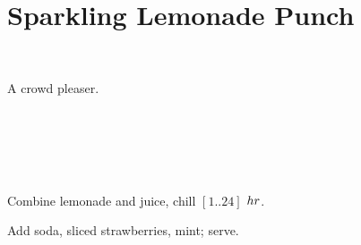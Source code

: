\section[Lemonade Punch]{Sparkling Lemonade Punch}~


\begin{recipestats}[
	servings=8,
	preptime=10~\minute,
	inactivetime=1~\hour,
	source=The~Gieskens,
]
\end{recipestats}

\begin{recipeabstract}
	A crowd pleaser.
\end{recipeabstract}


\begin{ingredientcolumns}[1]
	\begin{ingredientblock}
		\\
		\\
		\\
		\\
	\end{ingredientblock}
\end{ingredientcolumns}


\begin{preparation}
\item Combine lemonade and juice, chill $[1 .. 24]$ $\hour$.
\item Add soda, sliced strawberries, mint; serve.
\end{preparation}


\recipeend%
